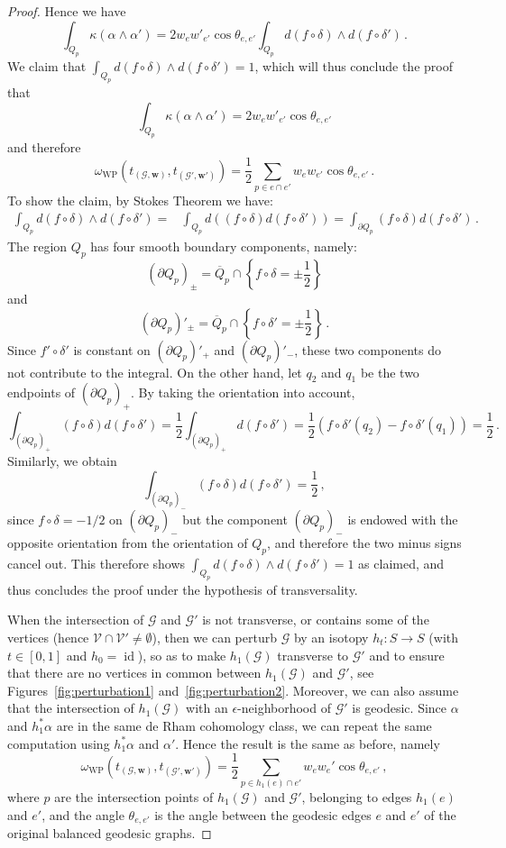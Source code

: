 \documentclass[11pt]{article}
\theoremstyle{definition}
\numberwithin{equation}{section}
\numberwithin{figure}{section}
\numberwithin{table}{section}
\newcommand{\weil}{{\mathrm{W}\!\mathrm{P}}}
\DeclareMathOperator{\id}{id}
\begin{document}
\begin{proof}
Hence we have
\[
\int_{Q_p}\kappa(\alpha\wedge\alpha')=2w_e w'_{e'}\cos\theta_{e,e'}\int_{Q_p}d(f\circ\delta)\wedge d(f\circ\delta')\,.
\]
We claim that $\int_{Q_p}d(f\circ\delta)\wedge d(f\circ\delta')=1$, which will thus conclude the proof that
\[
\int_{Q_p}\kappa(\alpha\wedge\alpha')=2w_e w'_{e'}\cos\theta_{e,e'}
\]
and therefore
\[
\omega_\weil\left(t_{(\mathcal G,\mathbf w)},t_{(\mathcal G',\mathbf w')}\right)=\frac{1}{2}\sum_{p\in e\cap e'}w_ew_{e'}\cos \theta_{e,e'}\,.
\]
To show the claim, by Stokes Theorem we have:
\begin{align*}
\int_{Q_p}d(f\circ\delta)\wedge d(f\circ\delta')=&
\int_{Q_p}d((f\circ\delta) d(f\circ\delta'))=\int_{\partial Q_p}(f\circ\delta) d(f\circ\delta')\,.
\end{align*}
The region $Q_p$ has four smooth boundary components, namely:
\[
(\partial Q_p)_{\pm}=\overline Q_p\cap \left\{f\circ \delta=\pm\frac{1}{2}\right\}
\]
and
\[
(\partial Q_p)'_{\pm}=\overline Q_p\cap \left\{f\circ \delta'=\pm\frac{1}{2}\right\}\,.
\]
Since $f'\circ \delta'$ is constant on $(\partial Q_p)'_{+}$ and $(\partial Q_p)'_{-}$, these two components do not contribute to the integral. On the other hand, let $q_2$ and $q_1$ be the two endpoints of $(\partial Q_p)_{+}$. By taking the orientation into account,
\[
\int_{(\partial Q_p)_+}(f\circ\delta) d(f\circ\delta')=\frac{1}{2}\int_{(\partial Q_p)_+} d(f\circ\delta')=\frac{1}{2}(f\circ \delta'(q_2)-f\circ \delta'(q_1))=\frac{1}{2}\,.
\]
Similarly, we obtain
\[
\int_{(\partial Q_p)_-}(f\circ\delta) d(f\circ\delta')=\frac{1}{2}\,,
\]
since $f\circ \delta=-1/2$ on $(\partial Q_p)_-$ but the component $(\partial Q_p)_-$ is endowed with the opposite orientation from the orientation of $Q_p$, and therefore the two minus signs cancel out. This therefore shows $\int_{Q_p}d(f\circ\delta)\wedge d(f\circ\delta')=1$ as claimed, and thus concludes the proof under the hypothesis of transversality.

When the intersection of $\mathcal G$ and $\mathcal G'$ is not transverse, or contains some of the vertices (hence $\mathcal V\cap\mathcal V'\neq \emptyset$), then we can perturb $\mathcal G$ by an isotopy $h_t:S\to S$ (with $t\in[0,1]$ and $h_0=\id$), so as to make $h_1(\mathcal G)$ transverse to $\mathcal G'$ and to ensure that there are no vertices in common between $h_1(\mathcal G)$ and $\mathcal G'$, see Figures~\ref{fig:perturbation1} and~\ref{fig:perturbation2}. Moreover, we can also assume that the intersection of $h_1(\mathcal G)$ with an $\epsilon$-neighborhood of $\mathcal G'$ is geodesic. Since $\alpha$ and $h_1^*\alpha$ are in the same de Rham cohomology class, we can repeat the same computation using $h_1^*\alpha$ and $\alpha'$. Hence the result is the same as before, namely
\[
\omega_\weil\left(t_{(\mathcal G,\mathbf w)},t_{(\mathcal G',\mathbf w')}\right)=\frac{1}{2}\sum_{p\in h_1(e)\cap e'}w_ew_e'\cos \theta_{e,e'}\,,
\]
where $p$ are the intersection points of $h_1(\mathcal G)$ and $\mathcal G'$, belonging to edges $h_1(e)$ and $e'$, and the angle $\theta_{e,e'}$ is the angle between the geodesic edges $e$ and $e'$ of the original balanced geodesic graphs.
\end{proof}
\end{document}

